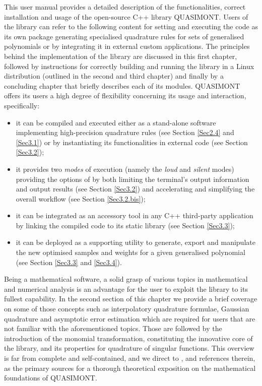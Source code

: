\documentclass[a4paper, twosided]{book}
\begin{document}
This user manual provides a detailed description of the functionalities, correct installation and usage of the open-source C++ library QUASIMONT. Users of the library can refer to the following content for setting and executing the code as its own package generating specialised quadrature rules for sets of generalised polynomials or by integrating it in external custom applications. The principles behind the implementation of the library are discussed in this first chapter, followed by instructions for correctly building and running the library in a Linux distribution (outlined in the second and third chapter) and finally by a concluding chapter that briefly describes each of its modules. QUASIMONT offers its users a high degree of flexibility concerning its usage and interaction, specifically:
\begin{itemize}
    \item it can be compiled and executed either as a stand-alone software implementing high-precision quadrature rules (see Section \ref{Sec2.4} and \ref{Sec3.1}) or by instantiating its functionalities in external code (see Section \ref{Sec3.2});
    \item it provides two {\itshape modes} of execution (namely the {\itshape loud} and {\itshape silent} modes) providing the options of by both limiting the terminal's output information and output results (see Section \ref{Sec3.2}) and accelerating and simplifying the overall workflow (see Section \ref{Sec3.2.bis});
    \item it can be integrated as an accessory tool in any C++ third-party application by linking the compiled code to its static library (see Section \ref{Sec3.3});
    \item it can be deployed as a supporting utility to generate, export and manipulate the new optimised samples and weights for a given generalised polynomial (see Section \ref{Sec3.3} and \ref{Sec3.4}).
\end{itemize}
Being a mathematical software, a solid grasp of various topics in mathematical and numerical analysis is an advantage for the user to exploit the library to its fullest capability. In the second section of this chapter we provide a brief coverage on some of those concepts such as interpolatory quadrature formulae, Gaussian quadrature and asymptotic error estimation which are required for users that are not familiar with the aforementioned topics. Those are followed by the introduction of the monomial transformation, constituting the innovative core of the library, and its properties for quadrature of singular functions. This overview is far from complete and self-contained, and we direct to \cite{Lombardi09, Lombardi21}, and references therein, as the primary sources for a thorough theoretical exposition on the mathematical foundations of QUASIMONT.
\end{document}
